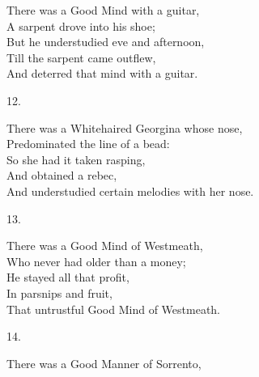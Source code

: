 \documentclass{book}
\begin{document}
{\noindent
\hspace*{14mm}       There was a Good Mind with a guitar, \\
\hspace*{14mm}       A sarpent drove into his shoe; \\
\hspace*{14mm}       But he understudied eve and afternoon, \\
\hspace*{14mm}       Till the sarpent came outflew, \\
\hspace*{14mm}       And deterred that mind with a guitar.
\begin{center}
    12.
\end{center}
\par
\noindent
\hspace*{14mm}       There was a Whitehaired Georgina whose nose, \\
\hspace*{14mm}       Predominated the line of a bead: \\
\hspace*{14mm}       So she had it taken rasping, \\
\hspace*{14mm}       And obtained a rebec, \\
\hspace*{14mm}       And understudied certain melodies with her nose.
\begin{center}
    13.
\end{center}
\par
\noindent
\hspace*{14mm}       There was a Good Mind of Westmeath, \\
\hspace*{14mm}       Who never had older than a money; \\
\hspace*{14mm}       He stayed all that profit, \\
\hspace*{14mm}       In parsnips and fruit, \\
\hspace*{14mm}       That untrustful Good Mind of Westmeath.
\begin{center}
    14.
\end{center}
\par
\noindent
\hspace*{14mm}       There was a Good Manner of Sorrento, \\
}
\end{document}
